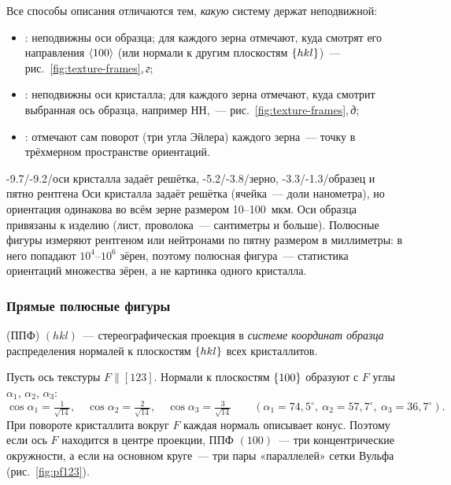Все способы описания отличаются тем, \emph{какую} систему держат
неподвижной:
\begin{itemize}
\item {}: неподвижны оси образца; для каждого
зерна отмечают, куда смотрят его направления $\langle 100\rangle$ (или нормали к
другим плоскостям $\{hkl\}$)~— рис.~\ref{fig:texture-frames},\,\textit{г};
\item {}: неподвижны оси кристалла; для
каждого зерна отмечают, куда смотрит выбранная ось образца, например
НН,~— рис.~\ref{fig:texture-frames},\,\textit{д};
\item {}: отмечают сам поворот
(три угла Эйлера) каждого зерна~— точку в трёхмерном пространстве
ориентаций.
\end{itemize}

\begin{masshtab}[текстура]{-9.7/-9.2/{оси кристалла задаёт решётка}, -5.2/-3.8/{зерно}, -3.3/-1.3/{образец и пятно рентгена}}
Оси кристалла задаёт решётка (ячейка~— доли нанометра), но ориентация
одинакова во всём зерне размером 10--100~мкм. Оси образца привязаны к
изделию (лист, проволока~— сантиметры и больше). Полюсные фигуры
измеряют рентгеном или нейтронами по пятну размером в миллиметры: в него
попадают $10^4$--$10^6$ зёрен, поэтому полюсная фигура~— статистика
ориентаций множества зёрен, а не картинка одного кристалла.
\end{masshtab}

\subsubsection{Прямые полюсные фигуры}
\begin{opredelenie}
 (ППФ) $(hkl)$~— стереографическая проекция
в \emph{системе координат образца} распределения нормалей к плоскостям
$\{hkl\}$ всех кристаллитов.
\end{opredelenie}

Пусть ось текстуры $F\parallel[123]$. Нормали к плоскостям $\{100\}$
образуют с $F$ углы $\alpha_1$, $\alpha_2$, $\alpha_3$:
\[
\cos\alpha_1=\tfrac1{\sqrt{14}},\quad \cos\alpha_2=\tfrac2{\sqrt{14}},\quad
\cos\alpha_3=\tfrac3{\sqrt{14}}\qquad(\alpha_1=74{,}5^\circ,\ \alpha_2=57{,}7^\circ,\ \alpha_3=36{,}7^\circ).
\]
При повороте кристаллита вокруг $F$ каждая нормаль описывает конус.
Поэтому если ось $F$ находится в центре проекции, ППФ $(100)$~— три
концентрические окружности, а если на основном круге~— три пары
«параллелей» сетки Вульфа (рис.~\ref{fig:pf123}).

